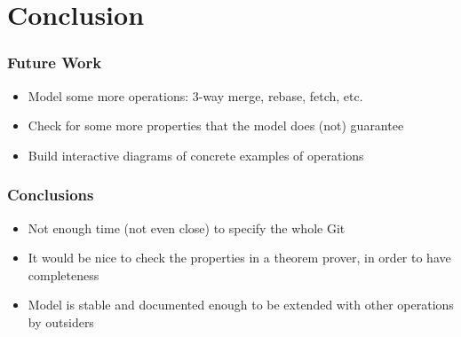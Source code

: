\documentclass{beamer}
\begin{document}
\section{Conclusion}

\begin{frame}
	\frametitle{Future Work}
	\begin{itemize}
	\item Model some more operations: 3-way merge, rebase, fetch, etc. 
	\item Check for some more properties that the model does (not) guarantee
	\item Build interactive diagrams of concrete examples of operations 
	\end{itemize}
\end{frame}

\begin{frame}
	\frametitle{Conclusions}
	\begin{itemize}
	\item Not enough time (not even close) to specify the whole Git
	\item It would be nice to check the properties in a theorem prover, in
	order to have completeness
	\item Model is stable and documented enough to be extended with other operations by outsiders
	\end{itemize}
\end{frame}
\end{document}
